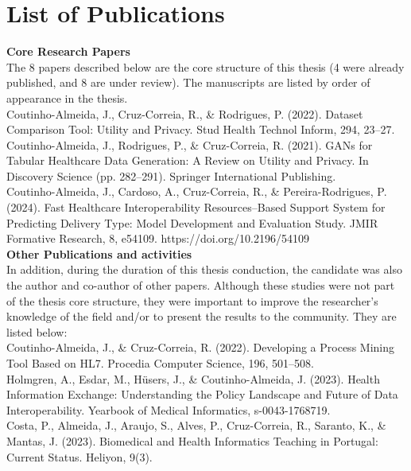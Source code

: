 \chapter*{List of Publications}



\textbf{Core Research Papers} \\
The 8 papers described below are the core structure of this thesis (4 were already published, and 8 are under review). The manuscripts are listed by order of appearance in the thesis.
\\

Coutinho-Almeida, J., Cruz-Correia, R., \& Rodrigues, P. (2022). Dataset Comparison Tool: Utility and Privacy. Stud Health Technol Inform, 294, 23–27.\\

Coutinho-Almeida, J., Rodrigues, P., \& Cruz-Correia, R. (2021). GANs for Tabular Healthcare Data Generation: A Review on Utility and Privacy. In Discovery Science (pp. 282–291). Springer International Publishing.\\

Coutinho-Almeida, J., Cardoso, A., Cruz-Correia, R., \& Pereira-Rodrigues, P. (2024). Fast Healthcare Interoperability Resources–Based Support System for Predicting Delivery Type: Model Development and Evaluation Study. JMIR Formative Research, 8, e54109. https://doi.org/10.2196/54109\\




\textbf{Other Publications and activities}\\
In addition, during the duration of this thesis conduction, the candidate was also the author and co-author of other papers. Although these studies were not part of the thesis core structure, they were important to improve the researcher's knowledge of the field and/or to present the results to the community. They are listed below:\\


Coutinho-Almeida, J., \& Cruz-Correia, R. (2022). Developing a Process Mining Tool Based on HL7. Procedia Computer Science, 196, 501–508.\\


Holmgren, A., Esdar, M., Hüsers, J., \& Coutinho-Almeida, J. (2023). Health Information Exchange: Understanding the Policy Landscape and Future of Data Interoperability. Yearbook of Medical Informatics, s-0043-1768719.\\



Costa, P., Almeida, J., Araujo, S., Alves, P., Cruz-Correia, R., Saranto, K., \& Mantas, J. (2023). Biomedical and Health Informatics Teaching in Portugal: Current Status. Heliyon, 9(3).\\

